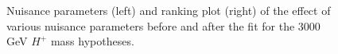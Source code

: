 \begin{figure}[H]
  \centering
  \caption{Nuisance parameters (left) and ranking plot (right) of the effect of various nuisance parameters before and after the fit for the 3000 GeV $H^{+}$ mass hypotheses.}
\end{figure}
